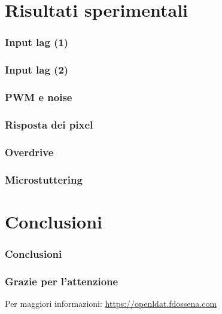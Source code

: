 \documentclass{beamer}
\begin{document}
\section{Risultati sperimentali}
\begin{frame}
	\frametitle{Input lag (1)}
	\lipsum[1]
\end{frame}
\begin{frame}
	\frametitle{Input lag (2)}
	\lipsum[1]
\end{frame}
\begin{frame}
	\frametitle{PWM e noise}
	\lipsum[1]
\end{frame}
\begin{frame}
	\frametitle{Risposta dei pixel}
	\lipsum[1]
\end{frame}
\begin{frame}
	\frametitle{Overdrive}
	\lipsum[1]
\end{frame}
\begin{frame}
	\frametitle{Microstuttering}
	\lipsum[1]
\end{frame}

\section{Conclusioni}
\begin{frame}
	\frametitle{Conclusioni}
	\lipsum[1]
\end{frame}
\begin{frame}
	\frametitle{Grazie per l'attenzione}
	\centering
	Per maggiori informazioni:
	\textcolor{blue}{\url{https://openldat.fdossena.com}}
\end{frame}
\end{document}
